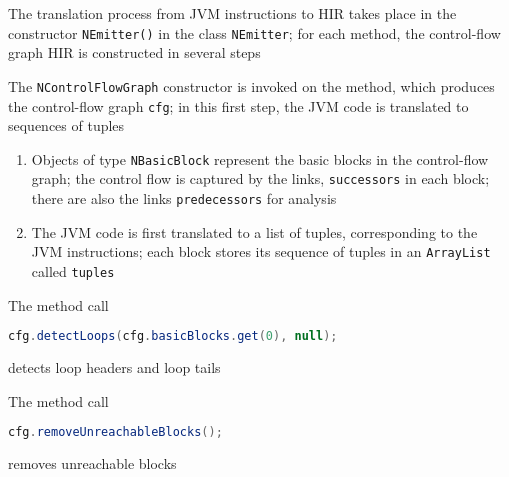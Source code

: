 \documentclass[8pt,a4paper,compress]{beamer}
\begin{document}
\begin{frame}[fragile]
\pause

The translation process from JVM instructions to HIR takes place in the constructor \lstinline{NEmitter()} in the class \lstinline{NEmitter}; for each method, the control-flow graph HIR is constructed in several steps

\pause
\bigskip

The \lstinline{NControlFlowGraph} constructor is invoked on the method, which produces the control-flow graph \lstinline{cfg}; in this first step, the JVM code is translated to sequences of tuples

\begin{enumerate}
\item Objects of type \lstinline{NBasicBlock} represent the basic blocks in the control-flow graph; the control flow is captured by the links, \lstinline{successors} in each block; there are also the links \lstinline{predecessors} for analysis

\item The JVM code is first translated to a list of tuples, corresponding to the JVM instructions; each block stores its sequence of tuples in an \lstinline{ArrayList} called \lstinline{tuples}
\end{enumerate}

\pause
\bigskip

The method call
\begin{lstlisting}[language=Java]
cfg.detectLoops(cfg.basicBlocks.get(0), null);
\end{lstlisting}
detects loop headers and loop tails

\pause
\bigskip

The method call
\begin{lstlisting}[language=Java]
cfg.removeUnreachableBlocks();
\end{lstlisting}
removes unreachable blocks
\end{frame}
\end{document}
